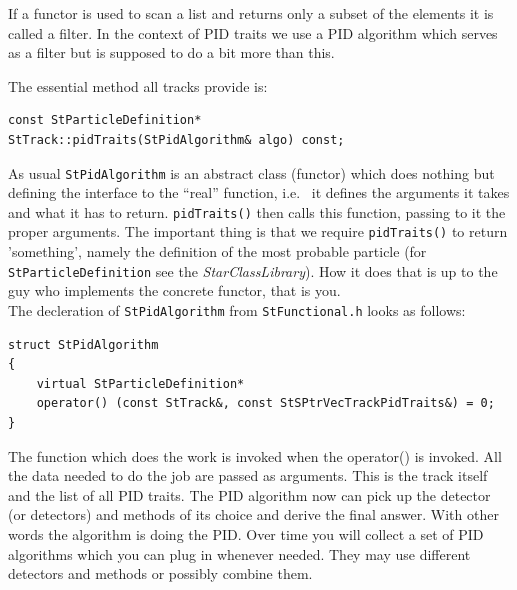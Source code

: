\documentclass[twoside]{article}
\newcommand{\name}[1]{\textsl{#1}}%
\begin{document}
If a functor is used to scan a list and returns only a subset of the
elements it is called a filter. In the context of PID traits we use a
PID algorithm which serves as a filter but is supposed to do a bit
more than this.

The essential method all tracks provide is:
\begin{verbatim}
const StParticleDefinition*
StTrack::pidTraits(StPidAlgorithm& algo) const;
\end{verbatim}

As usual \texttt{StPidAlgorithm} is an abstract class (functor) which
does nothing but defining the interface to the ``real'' function,
i.e.~ it defines the arguments it takes and what it has to return.
\texttt{pidTraits()} then calls this function, passing to it the
proper arguments. The important thing is that we require
\texttt{pidTraits()} to return 'something', namely the definition of
the most probable particle (for \texttt{StParticleDefinition} see the
\name{StarClassLibrary}). How it does that is up to the guy who
implements the concrete
functor, that is you.\\
The decleration of \texttt{StPidAlgorithm} from
\texttt{StFunctional.h} looks as follows:
\begin{verbatim}
struct StPidAlgorithm
{
    virtual StParticleDefinition*
    operator() (const StTrack&, const StSPtrVecTrackPidTraits&) = 0;
}
\end{verbatim}
 The function which does the work is
invoked when the operator() is invoked.  All the data needed to do the
job are passed as arguments.  This is the track itself and the list of
all PID traits. The PID algorithm now can pick up the detector (or
detectors) and methods of its choice and derive the final answer. With
other words the algorithm is doing the PID.  Over time you will
collect a set of PID algorithms which you can plug in whenever needed.
They may use different detectors and methods or possibly combine them.
\end{document}
